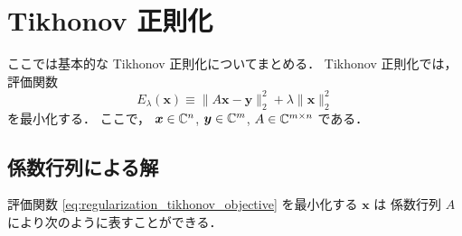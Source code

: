 %

\chapter{Tikhonov 正則化}\label{chap:regularization_tikhonov}

ここでは基本的な Tikhonov 正則化についてまとめる．
Tikhonov 正則化では，評価関数
\begin{equation}
    E_{\lambda}(\bm{x}) \equiv \|A \bm{x} - \bm{y}\|_2^2 + \lambda \|\bm{x}\|_2^2
    \label{eq:regularization_tikhonov_objective}
\end{equation}
を最小化する．
ここで，
$\bm{x} \in \mathbb{C}^n$,
$\bm{y} \in \mathbb{C}^m$,
$A \in \mathbb{C}^{m \times n}$
である．

\section{係数行列による解}

評価関数 \eqref{eq:regularization_tikhonov_objective} を最小化する $\bm{x}$ は
係数行列 $A$ により次のように表すことができる．

